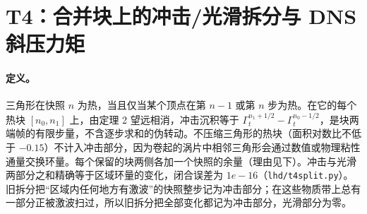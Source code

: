 \section{T4：合并块上的冲击/光滑拆分与 DNS 斜压力矩}
\paragraph{定义。}三角形在快照 $n$ 为热，当且仅当某个顶点在第 $n-1$ 或第 $n$ 步为热。在它的每个热块 $[n_0,n_1]$ 上，由定理 2 望远相消，冲击沉积等于 $\Gamma_t^{n_1+1/2}-\Gamma_t^{n_0-1/2}$，是块两端帧的有限步量，不含逐步求和的伪转动。不压缩三角形的热块（面积对数比不低于 $-0.15$）不计入冲击部分，因为卷起的涡片中相邻三角形会通过数值或物理粘性通量交换环量。每个保留的块两侧各加一个快照的余量（理由见下）。冲击与光滑两部分之和精确等于区域环量的变化，闭合误差为 $1e-16$（\texttt{lhd/t4split.py}）。旧拆分把“区域内任何地方有激波”的快照整步记为冲击部分；在这些物质带上总有一部分正被激波扫过，所以旧拆分把全部变化都记为冲击部分，光滑部分为零。
